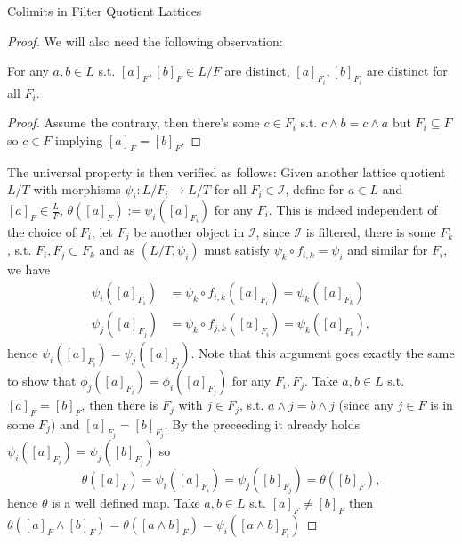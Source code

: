 \begin{subsection}{Colimits in Filter Quotient Lattices}
\begin{proof}
        We will also need the following observation:
        \begin{lemma} \label{utillemmacolim}
            For any \( a, b \in L \) s.t. \( [a]_F, [b]_F \in L / F \) are distinct, \( [a]_{F_i}, [b]_{F_i} \)
            are distinct for all \( F_i \).
        \end{lemma}
        \begin{proof}
             Assume the contrary, then there's some \( c \in F_i \) s.t. \( c \wedge b = c \wedge a \)
            but \( F_i \subseteq F \) so \( c \in F \) implying \( [a]_F = [b]_F \).
        \end{proof}
        The universal property is then verified as follows: Given another lattice quotient \( L / T \)
        with morphisms \( \psi_i : L / F_i \to L / T \) for all \( F_i \in \mathcal{I} \), define for \( a \in L \) and \( [a]_F \in \frac{L}{F} \),
        \( \theta([a]_F) := \psi_i([a]_{F_i}) \) for any \( F_i \). This is indeed independent of the choice of \( F_i \), let \( F_j \)
        be another object in \( \mathcal{I} \), since \( \mathcal{I} \) is filtered, there is some \( F_k \), s.t. \( F_i, F_j \subset F_k \)
        and as \( (L / T, \psi_i) \) must satisfy \( \psi_k \circ f_{i,k} = \psi_i \) and similar for \( F_i \), we have
        \begin{align*}
            \psi_i([a]_{F_i}) &= \psi_k \circ f_{i,k}([a]_{F_i}) = \psi_{k}([a]_{F_k}) \\
            \psi_j([a]_{F_j}) &= \psi_k \circ f_{j,k}([a]_{F_i}) = \psi_{k}([a]_{F_k}),
        \end{align*}
        hence \( \psi_i([a]_{F_i}) = \psi_j([a]_{F_j}) \). Note that this argument goes exactly the same to show that 
        \( \phi_j([a]_{F_i}) = \phi_i([a]_{F_j}) \) for any \( F_i, F_j \).
        \newline
        Take \( a, b \in L \) s.t. \( [a]_F = [b]_F \), then there is \( F_j \) with \( j \in F_j \), s.t. \( a \wedge j = b \wedge j \)
        (since any \( j \in F \) is in some \( F_j \)) and \( [a]_{F_j} = [b]_{F_j} \).
        By the preceeding it already holds \( \psi_i([a]_{F_i}) = \psi_j([b]_{F_j}) \) so 
        \[ 
            \theta([a]_{F}) = \psi_i([a]_{F_i}) = \psi_j([b]_{F_j}) = \theta([b]_{F}),
        \]
        hence \( \theta \) is a well defined map.
        \newline
        Take \( a, b \in L \) s.t. \( [a]_F \neq [b]_F \) then 
        \( \theta([a]_F \wedge [b]_F) = \theta([a \wedge b]_F) = \psi_i([a \wedge b]_{F_i}) \)

\end{proof}
\end{subsection}
